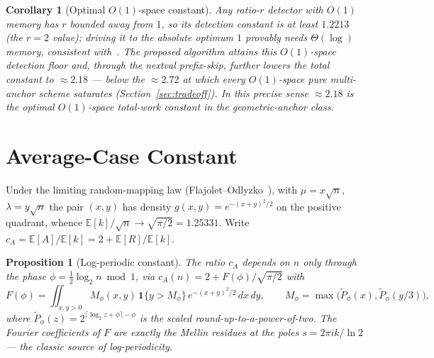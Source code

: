 \documentclass[11pt]{article}
\newtheorem{proposition}[theorem]{Proposition}
\newtheorem{corollary}[theorem]{Corollary}
\begin{document}
\begin{corollary}[Optimal $O(1)$-space constant]
\label{cor:o1-optimal}
Any ratio-$r$ detector with $O(1)$ memory has $r$ bounded away from $1$, so its
detection constant is at least $1.2213$ (the $r=2$ value); driving it to the
absolute optimum $1$ provably needs $\Theta(\log)$ memory, consistent
with~\cite{ssy1982}. The proposed algorithm attains this $O(1)$-space detection
floor and, through the nextval prefix-skip, further lowers the \emph{total}
constant to $\approx2.18$ --- below the $\approx2.72$ at which every $O(1)$-space
pure multi-anchor scheme saturates (Section~\ref{sec:tradeoff}). In this precise
sense $\approx2.18$ is the optimal $O(1)$-space total-work constant in the
geometric-anchor class.
\end{corollary}

\section{Average-Case Constant}
\label{sec:average}

Under the limiting random-mapping law (Flajolet--Odlyzko~\cite{flajolet}), with
$\mu=x\sqrt n$, $\lambda=y\sqrt n$ the pair $(x,y)$ has density
$g(x,y)=e^{-(x+y)^2/2}$ on the positive quadrant, whence
$\mathbb E[k]/\sqrt n\to\sqrt{\pi/2}=1.25331$. Write
$c_A=\mathbb E[A]/\mathbb E[k]=2+\mathbb E[R]/\mathbb E[k]$.

\begin{proposition}[Log-periodic constant]
\label{prop:cA}
The ratio $c_A$ depends on $n$ only through the phase
$\phi=\tfrac12\log_2 n\bmod 1$, via $c_A(n)=2+F(\phi)/\sqrt{\pi/2}$ with
\[
F(\phi)=\iint_{x,y>0} M_\phi(x,y)\,\mathbf 1\{y>M_\phi\}\,e^{-(x+y)^2/2}\,dx\,dy,
\qquad M_\phi=\max\!\big(\tilde P_\phi(x),\tilde P_\phi(y/3)\big),
\]
where $\tilde P_\phi(z)=2^{\lceil\log_2 z+\phi\rceil-\phi}$ is the scaled
round-up-to-a-power-of-two. The Fourier coefficients of $F$ are exactly the
Mellin residues at the poles $s=2\pi i k/\ln 2$ --- the classic source of
log-periodicity.
\end{proposition}
\end{document}
